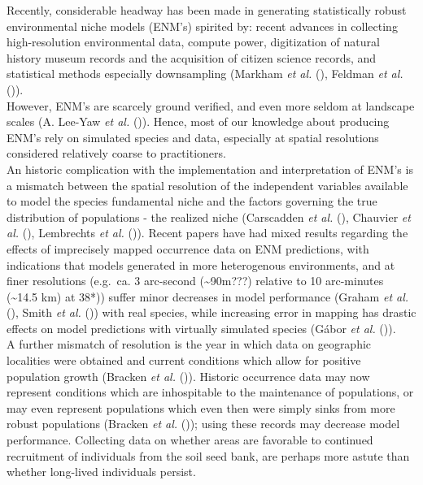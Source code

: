 \documentclass[
]{article}
\begin{document}
Recently, considerable headway has been made in generating statistically
robust environmental niche models (ENM's) spirited by: recent advances
in collecting high-resolution environmental data, compute power,
digitization of natural history museum records and the acquisition of
citizen science records, and statistical methods especially downsampling
(Markham \emph{et al.} (), Feldman
\emph{et al.} ()).\\
However, ENM's are scarcely ground verified, and even more seldom at
landscape scales (A. Lee-Yaw \emph{et al.}
()). Hence, most of our knowledge about
producing ENM's rely on simulated species and data, especially at
spatial resolutions considered relatively coarse to practitioners.\\
An historic complication with the implementation and interpretation of
ENM's is a mismatch between the spatial resolution of the independent
variables available to model the species fundamental niche and the
factors governing the true distribution of populations - the realized
niche (Carscadden \emph{et al.}
(), Chauvier \emph{et al.}
(), Lembrechts \emph{et al.}
()). Recent papers have
had mixed results regarding the effects of imprecisely mapped occurrence
data on ENM predictions, with indications that models generated in more
heterogenous environments, and at finer resolutions (e.g.~ca. 3
arc-second (\textasciitilde90m???) relative to 10 arc-minutes
(\textasciitilde14.5 km) at 38*)) suffer minor decreases in model
performance (Graham \emph{et al.}
(), Smith \emph{et al.}
()) with real species, while
increasing error in mapping has drastic effects on model predictions
with virtually simulated species (Gábor \emph{et al.}
()).\\
A further mismatch of resolution is the year in which data on geographic
localities were obtained and current conditions which allow for positive
population growth (Bracken \emph{et al.}
()). Historic occurrence data
may now represent conditions which are inhospitable to the maintenance
of populations, or may even represent populations which even then were
simply sinks from more robust populations (Bracken \emph{et al.}
()); using these records may
decrease model performance. Collecting data on whether areas are
favorable to continued recruitment of individuals from the soil seed
bank, are perhaps more astute than whether long-lived individuals
persist.
\end{document}
